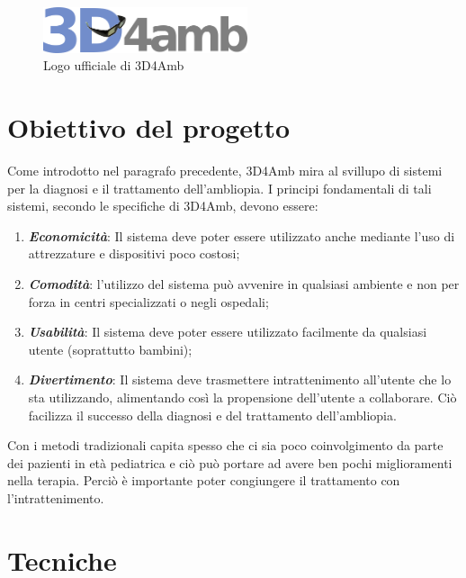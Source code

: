 \documentclass[12pt,a4paper,openright,twoside]{book}
\begin{document}
     \begin{figure}[h]
    	\centering   	
    	\includegraphics[width=60mm]{logo3d4amb.png}
    	\caption{Logo ufficiale di 3D4Amb}
    	\label{fig:3d4amb}
    \end{figure}
    \section{Obiettivo del progetto}
    Come introdotto nel paragrafo precedente, 3D4Amb mira al svillupo di sistemi per la diagnosi e il trattamento dell'ambliopia. I principi fondamentali di tali sistemi, secondo le specifiche di 3D4Amb, devono essere:
    \begin{enumerate}
    	\item \textbf{\textit{Economicità}}: Il sistema deve poter essere utilizzato anche mediante l'uso di attrezzature e dispositivi poco costosi;
    	\item \textbf{\textit{Comodità}}: l'utilizzo del sistema può avvenire in qualsiasi ambiente e non per forza in centri specializzati o negli ospedali;
    	\item \textbf{\textit{Usabilità}}: Il sistema deve poter essere utilizzato facilmente da qualsiasi utente (soprattutto bambini);
    	\item \textbf{\textit{Divertimento}}: Il sistema deve trasmettere intrattenimento all'utente che lo sta utilizzando, alimentando così la propensione dell'utente a collaborare. Ciò facilizza il successo della diagnosi e del trattamento dell'ambliopia. 
    \end{enumerate}
	Con i metodi tradizionali capita spesso che ci sia poco coinvolgimento da parte dei pazienti in età pediatrica e ciò può portare ad avere ben pochi miglioramenti nella terapia. Perciò è importante poter congiungere il trattamento con l'intrattenimento.

    \section{Tecniche}
\end{document}
